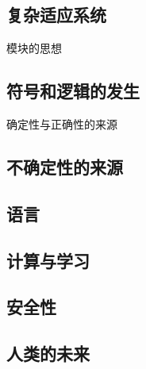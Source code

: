 \documentclass[a4paper,12pt]{article}
\begin{document}
\subsection{复杂适应系统}

模块的思想

\subsection{符号和逻辑的发生}

确定性与正确性的来源

\subsection{不确定性的来源}

\subsection{语言}

\subsection{计算与学习}

\subsection{安全性}

\subsection{人类的未来}
\end{document}
